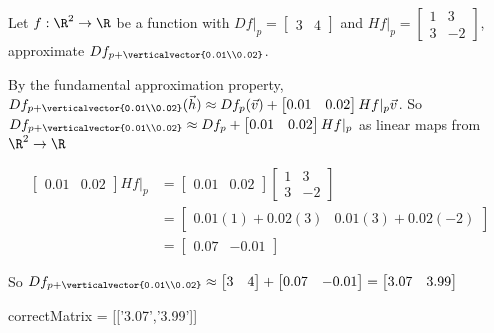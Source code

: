 \documentclass{ximera}
\begin{document}
\begin{question}
	Let $f:\R^2 \to \R$ be a function with  \(Df|_p =  \begin{bmatrix}  3 & 4\end{bmatrix}\) and 
	\(Hf|_p = \begin{bmatrix}  1 & 3 \\ 3 & -2\end{bmatrix}\), approximate $Df_{p+\verticalvector{0.01\\0.02}}$.
	\begin{solution}
		\begin{hint}
			By the fundamental approximation property, \(Df_{p+\verticalvector{0.01\\0.02}}(\vec{h}) \approx Df_{p}(\vec{v})+\begin{bmatrix} 0.01 & 0.02\end{bmatrix} Hf|_p \vec{v} \).  So
			$Df_{p+\verticalvector{0.01\\0.02}} \approx Df_{p}+\begin{bmatrix} 0.01 & 0.02\end{bmatrix} Hf|_p$ as linear maps from $\R^2 \to \R$
		\end{hint}
		\begin{hint}
			\begin{align*}
				\begin{bmatrix} 0.01 & 0.02\end{bmatrix} Hf|_p  &= \begin{bmatrix} 0.01 & 0.02\end{bmatrix} \begin{bmatrix}  1 & 3 \\ 3 & -2\end{bmatrix}\\
					&=\begin{bmatrix} 0.01(1)+0.02(3) & 0.01(3)+0.02(-2)\end{bmatrix}\\
					&=\begin{bmatrix} 0.07 & -0.01\end{bmatrix}
			\end{align*}
		\end{hint}
		\begin{hint}
			So $Df_{p+\verticalvector{0.01\\0.02}} \approx \begin{bmatrix}  3 & 4\end{bmatrix} + \begin{bmatrix} 0.07 & -0.01\end{bmatrix} = \begin{bmatrix} 3.07 & 3.99\end{bmatrix}$
		\end{hint}
	\begin{matrix-answer}
		correctMatrix = [['3.07','3.99']]
	\end{matrix-answer}
	\end{solution}
\end{question}
\end{document}
